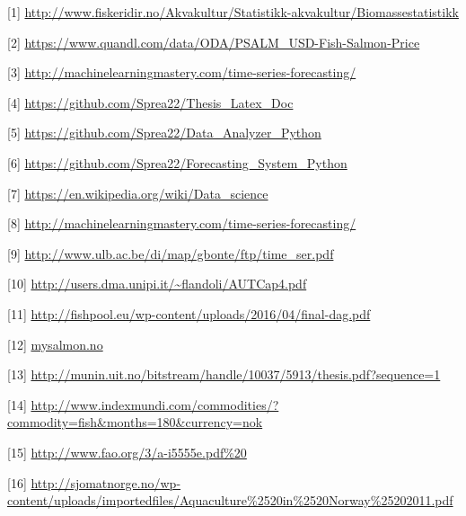 
[1] \url{http://www.fiskeridir.no/Akvakultur/Statistikk-akvakultur/Biomassestatistikk}


[2] \url{https://www.quandl.com/data/ODA/PSALM_USD-Fish-Salmon-Price}


[3] \url{http://machinelearningmastery.com/time-series-forecasting/}


[4] \url{https://github.com/Sprea22/Thesis_Latex_Doc}


[5] \url{https://github.com/Sprea22/Data_Analyzer_Python}


[6] \url{https://github.com/Sprea22/Forecasting_System_Python}

[7] \url{https://en.wikipedia.org/wiki/Data_science}

[8] \url{http://machinelearningmastery.com/time-series-forecasting/}

[9] \url{http://www.ulb.ac.be/di/map/gbonte/ftp/time_ser.pdf}

[10] \url{http://users.dma.unipi.it/~flandoli/AUTCap4.pdf}

[11] \url{http://fishpool.eu/wp-content/uploads/2016/04/final-dag.pdf}

[12] \url{mysalmon.no}

[13] \url{http://munin.uit.no/bitstream/handle/10037/5913/thesis.pdf?sequence=1}

[14] \url{http://www.indexmundi.com/commodities/?commodity=fish&months=180&currency=nok}

[15] \url{http://www.fao.org/3/a-i5555e.pdf%20}

[16] \url{http://sjomatnorge.no/wp-content/uploads/importedfiles/Aquaculture%2520in%2520Norway%25202011.pdf}